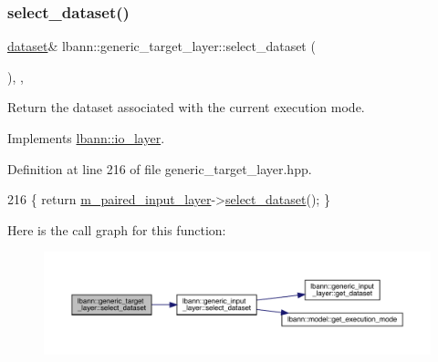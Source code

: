 \subsubsection{\texorpdfstring{select\+\_\+dataset()}{select\_dataset()}\hspace{0.1cm}{\footnotesize\ttfamily [1/2]}}
{\footnotesize\ttfamily \hyperlink{classlbann_1_1dataset}{dataset}\& lbann\+::generic\+\_\+target\+\_\+layer\+::select\+\_\+dataset (\begin{DoxyParamCaption}{ }\end{DoxyParamCaption})\hspace{0.3cm}{\ttfamily [inline]}, {\ttfamily [override]}, {\ttfamily [virtual]}}

Return the dataset associated with the current execution mode. 

Implements \hyperlink{classlbann_1_1io__layer_a66acbfb9c03a2e89a751b420416ae3bf}{lbann\+::io\+\_\+layer}.



Definition at line 216 of file generic\+\_\+target\+\_\+layer.\+hpp.


\begin{DoxyCode}
216 \{ \textcolor{keywordflow}{return} \hyperlink{classlbann_1_1generic__target__layer_a84da1260e9feb4fbc3e6f2315e4cab4b}{m\_paired\_input\_layer}->\hyperlink{classlbann_1_1generic__input__layer_a654365ee97a64c75a547cfb7ef329304}{select\_dataset}(); \}
\end{DoxyCode}
Here is the call graph for this function\+:\nopagebreak
\begin{figure}[H]
\begin{center}
\leavevmode
\includegraphics[width=350pt]{classlbann_1_1generic__target__layer_a0008630554477f39ad5ec950bf803876_cgraph}
\end{center}
\end{figure}
\mbox{\label{classlbann_1_1generic__target__layer_ac83761609177fc272fa9c2fe098d4676}} 
